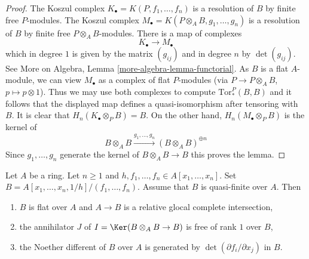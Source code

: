 \begin{proof}
The Koszul complex $K_\bullet = K(P, f_1, \ldots, f_n)$ is a resolution
of $B$ by finite free $P$-modules. The Koszul complex
$M_\bullet = K(P \otimes_A B, g_1, \ldots, g_n)$ is a resolution
of $B$ by finite free $P \otimes_A B$-modules. There is a map of
complexes
$$
K_\bullet \longrightarrow M_\bullet
$$
which in degree $1$ is given by the matrix $(g_{ij})$ and
in degree $n$ by $\det(g_{ij})$. See
More on Algebra, Lemma \ref{more-algebra-lemma-functorial}.
As $B$ is a flat $A$-module, we can view $M_\bullet$ as a complex
of flat $P$-modules (via $P \to P \otimes_A B$, $p \mapsto p \otimes 1$).
Thus we may use both complexes to compute $\text{Tor}_*^P(B, B)$ and
it follows that the displayed map defines a quasi-isomorphism after tensoring
with $B$. It is clear that $H_n(K_\bullet \otimes_P B) = B$.
On the other hand, $H_n(M_\bullet \otimes_P B)$ is the kernel of
$$
B \otimes_A B \xrightarrow{g_1, \ldots, g_n} (B \otimes_A B)^{\oplus n}
$$
Since $g_1, \ldots, g_n$ generate the kernel of $B \otimes_A B \to B$
this proves the lemma.
\end{proof}

\begin{lemma}
\label{lemma-quasi-finite-complete-intersection}
Let $A$ be a ring. Let $n \geq 1$ and
$h, f_1, \ldots, f_n \in A[x_1, \ldots, x_n]$.
Set $B = A[x_1, \ldots, x_n, 1/h]/(f_1, \ldots, f_n)$.
Assume that $B$ is quasi-finite over $A$.
Then
\begin{enumerate}
\item $B$ is flat over $A$ and $A \to B$ is a relative glocal complete
intersection,
\item the annihilator $J$ of $I = \Ker(B \otimes_A B \to B)$
is free of rank $1$ over $B$,
\item the Noether different of $B$ over $A$ is generated
by $\det(\partial f_i/\partial x_j)$ in $B$.
\end{enumerate}
\end{lemma}

